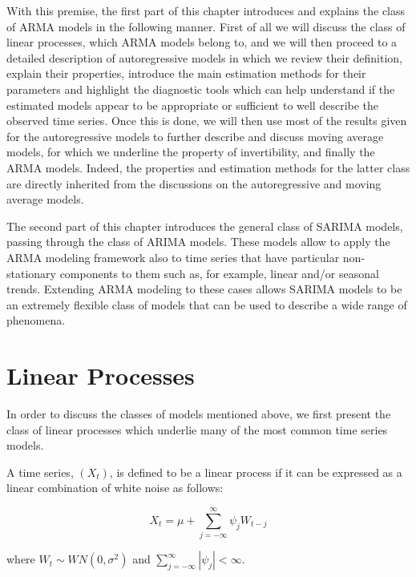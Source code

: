 \documentclass[]{book}
\theoremstyle{definition}
\theoremstyle{definition}
\theoremstyle{definition}
\theoremstyle{remark}
\let\BeginKnitrBlock\begin \let\EndKnitrBlock\end
\begin{document}
With this premise, the first part of this chapter introduces and
explains the class of ARMA models in the following manner. First of all
we will discuss the class of linear processes, which ARMA models belong
to, and we will then proceed to a detailed description of autoregressive
models in which we review their definition, explain their properties,
introduce the main estimation methods for their parameters and highlight
the diagnostic tools which can help understand if the estimated models
appear to be appropriate or sufficient to well describe the observed
time series. Once this is done, we will then use most of the results
given for the autoregressive models to further describe and discuss
moving average models, for which we underline the property of
invertibility, and finally the ARMA models. Indeed, the properties and
estimation methods for the latter class are directly inherited from the
discussions on the autoregressive and moving average models.

The second part of this chapter introduces the general class of SARIMA
models, passing through the class of ARIMA models. These models allow to
apply the ARMA modeling framework also to time series that have
particular non-stationary components to them such as, for example,
linear and/or seasonal trends. Extending ARMA modeling to these cases
allows SARIMA models to be an extremely flexible class of models that
can be used to describe a wide range of phenomena.

\hypertarget{linear-processes}{%
\section{Linear Processes}\label{linear-processes}}

In order to discuss the classes of models mentioned above, we first
present the class of linear processes which underlie many of the most
common time series models.

\BeginKnitrBlock{definition}[Linear Process]
\protect\hypertarget{def:lp}{}{\label{def:lp} {} }A time series, \((X_t)\), is defined to be a linear process if it
can be expressed as a linear combination of white noise as follows:

\[{X_t} = \mu + \sum\limits_{j =  - \infty }^\infty  {{\psi _j}{W_{t - j}}} \]

where \(W_t \sim WN(0, \sigma^2)\) and
\(\sum\limits_{j = - \infty }^\infty {\left| {{\psi _j}} \right|} < \infty\).
\EndKnitrBlock{definition}
\end{document}
